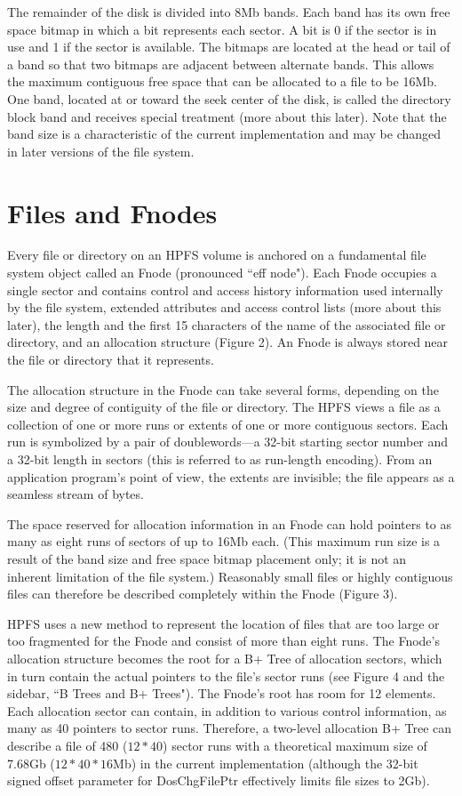 The remainder of the disk is divided into 8Mb bands.  Each band has its own
free space bitmap in which a bit represents each sector.  A bit is 0 if the
sector is in use and 1 if the sector is available.  The bitmaps are located
at the head or tail of a band so that two bitmaps are adjacent between
alternate bands.  This allows the maximum contiguous free space that can be
allocated to a file to be 16Mb.  One band, located at or toward the seek
center of the disk, is called the directory block band and receives special
treatment (more about this later).  Note that the band size is a
characteristic of the current implementation and may be changed in later
versions of the file system.
 
\section{\heads Files and Fnodes}
 
Every file or directory on an HPFS volume is anchored on a fundamental file
system object called an Fnode (pronounced ``eff node").  Each Fnode occupies a
single sector and contains control and access history information used
internally by the file system, extended attributes and access control lists
(more about this later), the length and the first 15 characters of the name
of the associated file or directory, and an allocation structure (Figure 2).
An Fnode is always stored near the file or directory that it represents.
 
The allocation structure in the Fnode can take several forms, depending on
the size and degree of contiguity of the file or directory.  The HPFS views a
file as a collection of one or more runs or extents of one or more contiguous
sectors.  Each run is symbolized by a pair of doublewords---a 32-bit starting
sector number and a 32-bit length in sectors (this is referred to as
run-length encoding).  From an application program's point of view, the
extents are invisible; the file appears as a seamless stream of bytes.
 
The space reserved for allocation information in an Fnode can hold pointers
to as many as eight runs of sectors of up to 16Mb each.  (This maximum run
size is a result of the band size and free space bitmap placement only; it is
not an inherent limitation of the file system.) Reasonably small files or
highly contiguous files can therefore be described completely within the
Fnode (Figure 3).
 
HPFS uses a new method to represent the location of files that are too large
or too fragmented for the Fnode and consist of more than eight runs.  The
Fnode's allocation structure becomes the root for a B+ Tree of allocation
sectors, which in turn contain the actual pointers to the file's sector runs
(see Figure 4 and the sidebar, ``B Trees and B+ Trees").  The Fnode's root has
room for 12 elements. Each allocation sector can contain, in addition to
various control information, as many as 40 pointers to sector runs.
Therefore, a two-level allocation B+ Tree can describe a file of 480 ($12*40$)
sector runs with a theoretical maximum size of 7.68Gb ($12*40*16$Mb) in the
current implementation (although the 32-bit signed offset parameter for
DosChgFilePtr effectively limits file sizes to 2Gb).
 
